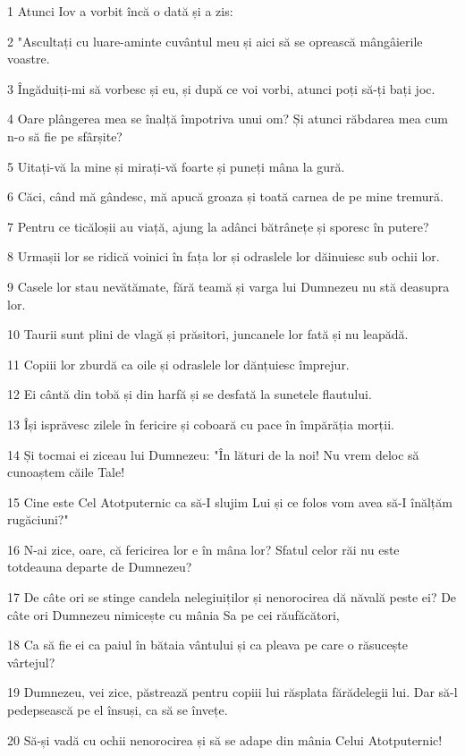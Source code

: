 \par 1 Atunci Iov a vorbit încă o dată și a zis:
\par 2 "Ascultați cu luare-aminte cuvântul meu și aici să se oprească mângâierile voastre.
\par 3 Îngăduiți-mi să vorbesc și eu, și după ce voi vorbi, atunci poți să-ți bați joc.
\par 4 Oare plângerea mea se înalță împotriva unui om? Și atunci răbdarea mea cum n-o să fie pe sfârșite?
\par 5 Uitați-vă la mine și mirați-vă foarte și puneți mâna la gură.
\par 6 Căci, când mă gândesc, mă apucă groaza și toată carnea de pe mine tremură.
\par 7 Pentru ce ticăloșii au viață, ajung la adânci bătrânețe și sporesc în putere?
\par 8 Urmașii lor se ridică voinici în fața lor și odraslele lor dăinuiesc sub ochii lor.
\par 9 Casele lor stau nevătămate, fără teamă și varga lui Dumnezeu nu stă deasupra lor.
\par 10 Taurii sunt plini de vlagă și prăsitori, juncanele lor fată și nu leapădă.
\par 11 Copiii lor zburdă ca oile și odraslele lor dănțuiesc împrejur.
\par 12 Ei cântă din tobă și din harfă și se desfată la sunetele flautului.
\par 13 Își isprăvesc zilele în fericire și coboară cu pace în împărăția morții.
\par 14 Și tocmai ei ziceau lui Dumnezeu: "În lături de la noi! Nu vrem deloc să cunoaștem căile Tale!
\par 15 Cine este Cel Atotputernic ca să-I slujim Lui și ce folos vom avea să-I înălțăm rugăciuni?"
\par 16 N-ai zice, oare, că fericirea lor e în mâna lor? Sfatul celor răi nu este totdeauna departe de Dumnezeu?
\par 17 De câte ori se stinge candela nelegiuiților și nenorocirea dă năvală peste ei? De câte ori Dumnezeu nimicește cu mânia Sa pe cei răufăcători,
\par 18 Ca să fie ei ca paiul în bătaia vântului și ca pleava pe care o răsucește vârtejul?
\par 19 Dumnezeu, vei zice, păstrează pentru copiii lui răsplata fărădelegii lui. Dar să-l pedepsească pe el însuși, ca să se învețe.
\par 20 Să-și vadă cu ochii nenorocirea și să se adape din mânia Celui Atotputernic!
